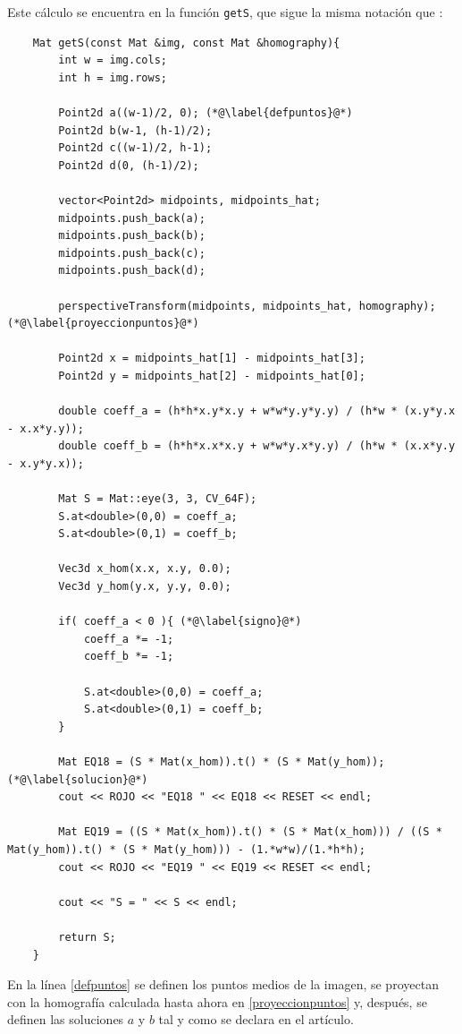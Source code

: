 \documentclass[a4paper, 11pt]{article}
\theoremstyle{definition}
\begin{document}
    Este cálculo se encuentra en la función \lstinline{getS}, que sigue la misma notación que \cite{LoopZhang}:
    \begin{lstlisting}
    Mat getS(const Mat &img, const Mat &homography){
        int w = img.cols;
        int h = img.rows;

        Point2d a((w-1)/2, 0); (*@\label{defpuntos}@*)
        Point2d b(w-1, (h-1)/2);
        Point2d c((w-1)/2, h-1);
        Point2d d(0, (h-1)/2);

        vector<Point2d> midpoints, midpoints_hat;
        midpoints.push_back(a);
        midpoints.push_back(b);
        midpoints.push_back(c);
        midpoints.push_back(d);

        perspectiveTransform(midpoints, midpoints_hat, homography); (*@\label{proyeccionpuntos}@*)

        Point2d x = midpoints_hat[1] - midpoints_hat[3];
        Point2d y = midpoints_hat[2] - midpoints_hat[0];

        double coeff_a = (h*h*x.y*x.y + w*w*y.y*y.y) / (h*w * (x.y*y.x - x.x*y.y));
        double coeff_b = (h*h*x.x*x.y + w*w*y.x*y.y) / (h*w * (x.x*y.y - x.y*y.x));

        Mat S = Mat::eye(3, 3, CV_64F);
        S.at<double>(0,0) = coeff_a;
        S.at<double>(0,1) = coeff_b;

        Vec3d x_hom(x.x, x.y, 0.0);
        Vec3d y_hom(y.x, y.y, 0.0);

        if( coeff_a < 0 ){ (*@\label{signo}@*)
            coeff_a *= -1;
            coeff_b *= -1;

            S.at<double>(0,0) = coeff_a;
            S.at<double>(0,1) = coeff_b;
        }

        Mat EQ18 = (S * Mat(x_hom)).t() * (S * Mat(y_hom)); (*@\label{solucion}@*)
        cout << ROJO << "EQ18 " << EQ18 << RESET << endl;

        Mat EQ19 = ((S * Mat(x_hom)).t() * (S * Mat(x_hom))) / ((S * Mat(y_hom)).t() * (S * Mat(y_hom))) - (1.*w*w)/(1.*h*h);
        cout << ROJO << "EQ19 " << EQ19 << RESET << endl;

        cout << "S = " << S << endl;

        return S;
    }
    \end{lstlisting}

    En la línea \ref{defpuntos} se definen los puntos medios de la imagen, se proyectan con la homografía calculada hasta ahora en \ref{proyeccionpuntos} y, después, se definen las soluciones $a$ y $b$ tal y como se declara en el artículo.
\end{document}
